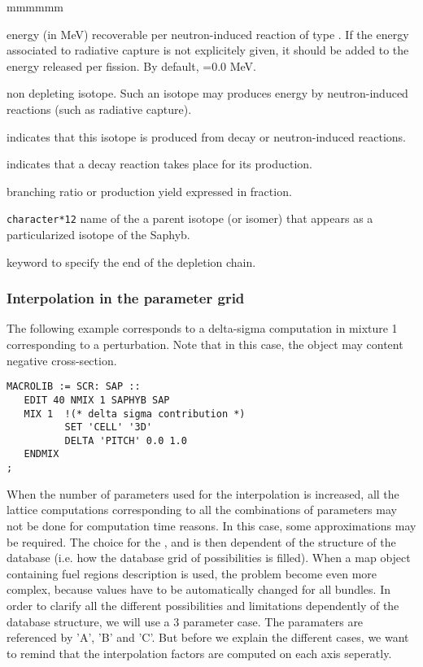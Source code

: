 \begin{ListeDeDescription}{mmmmmm}
\item[\dusa{energy}] energy (in MeV) recoverable per neutron-induced
reaction of type . If the energy associated to radiative capture
is not explicitely given, it should be added to the energy released per fission. By
default, =0.0 MeV.

\item[\moc{STABLE}] non depleting isotope. Such an isotope may produces
energy by neutron-induced reactions (such as radiative capture).

\item[\moc{FROM}] indicates that this isotope is produced from decay or
neutron-induced reactions.

\item[\moc{DECAY}] indicates that a decay reaction takes place for its
production.

\item[\dusa{yield}] branching ratio or production yield expressed in fraction.

\item[\dusa{NAMPAR}] {\tt character*12} name of the a parent isotope
(or isomer) that appears as a particularized isotope of the Saphyb.

\item[\moc{ENDCHAIN}] keyword to specify the end of the depletion chain.

\end{ListeDeDescription}


\subsubsection{Interpolation in the parameter grid}

The following example corresponds to a delta-sigma computation in mixture 1 corresponding to a perturbation. Note that in this case, the  object  may content negative cross-section. 
\begin{verbatim}
MACROLIB := SCR: SAP ::
   EDIT 40 NMIX 1 SAPHYB SAP
   MIX 1  !(* delta sigma contribution *)
          SET 'CELL' '3D'
          DELTA 'PITCH' 0.0 1.0
   ENDMIX
;
\end{verbatim}

When the number of parameters used for the interpolation is increased, all the lattice computations corresponding to all the combinations of parameters may not be done for computation time reasons. In this case, some approximations may be required. The choice for the ,  and  is then dependent of the structure of the database (i.e. how the database grid of possibilities is filled). When a {\sc map} object containing fuel regions description is used, the problem become even more complex, because values have to be automatically changed for all bundles. In order to clarify all the different possibilities and limitations dependently of the database structure, we will use a 3 parameter case. The paramaters are referenced by 'A', 'B' and 'C'. But before we explain the different cases, we want to remind that the interpolation factors are computed on each axis seperatly.

